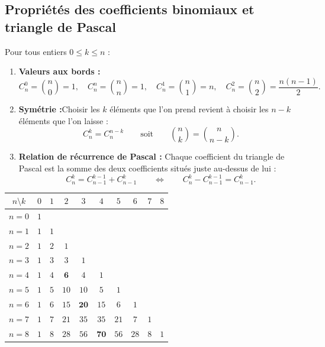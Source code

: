 \subsection{Propriétés des coefficients binomiaux et triangle de Pascal}

\begin{theoreme}
Pour tous entiers $0 \le k \le n$ :
\begin{enumerate}
    \item \textbf{Valeurs aux bords :}
    \[
        \boxed{C_n^0 = \binom{n}{0} = 1, \quad C_n^n = \binom{n}{n} = 1, \quad C_n^1 = \binom{n}{1} = n, \quad C_n^2 = \binom{n}{2} = \frac{n(n-1)}{2}}.
    \]
    \item \textbf{Symétrie :}Choisir les $k$ éléments que l'on prend revient à choisir les $n - k$ éléments que l'on laisse :
    \[
        \boxed{C_n^k = C_n^{n-k} \qquad \text{soit} \qquad \binom{n}{k} = \binom{n}{n-k}}.
    \]
    \item \textbf{Relation de récurrence de Pascal :} Chaque coefficient du triangle de Pascal est la somme des deux coefficients situés juste au-dessus de lui :
    \[
        \boxed{C_n^k = C_{n-1}^{k-1} + C_{n-1}^k \qquad \Longleftrightarrow \qquad C_n^k - C_{n-1}^{k-1} = C_{n-1}^k}.
    \]
\end{enumerate}
\end{theoreme}

\begin{center}
\renewcommand{\arraystretch}{1.25}
\begin{tabular}{c|ccccccccc}
$n \setminus k$ & $0$ & $1$ & $2$ & $3$ & $4$ & $5$ & $6$ & $7$ & $8$ \\
\hline
$n = 0$ & $1$ & & & & & & & & \\
$n = 1$ & $1$ & $1$ & & & & & & & \\
$n = 2$ & $1$ & $2$ & $1$ & & & & & & \\
$n = 3$ & $1$ & $3$ & $3$ & $1$ & & & & & \\
$n = 4$ & $1$ & $4$ & $\mathbf{6}$ & $4$ & $1$ & & & & \\
$n = 5$ & $1$ & $5$ & $10$ & $10$ & $5$ & $1$ & & & \\
$n = 6$ & $1$ & $6$ & $15$ & $\mathbf{20}$ & $15$ & $6$ & $1$ & & \\
$n = 7$ & $1$ & $7$ & $21$ & $35$ & $35$ & $21$ & $7$ & $1$ & \\
$n = 8$ & $1$ & $8$ & $28$ & $56$ & $\mathbf{70}$ & $56$ & $28$ & $8$ & $1$ \\
\end{tabular}
\end{center}

